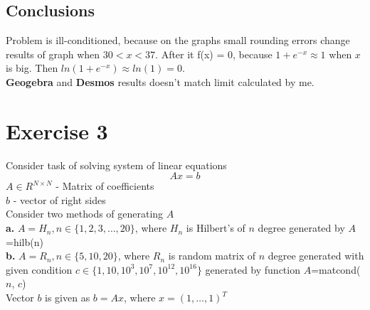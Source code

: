 \documentclass[11pt]{article}
\begin{document}
\subsection{Conclusions}
Problem is ill-conditioned, because on the graphs small rounding errors change results of graph when $30< x < 37$. 
After it f(x) = 0, because $1+e^{-x} \approx 1$ when $x$ is big. Then $ln(1+e^{-x}) \approx ln(1) = 0$. \\ 
\textbf{Geogebra} and \textbf{Desmos} results doesn't match limit calculated by me.
\section{Exercise 3}
Consider task of solving system of linear equations
\begin{equation*}
    Ax = b
\end{equation*}
$A \in R^{N \times N}$ - Matrix of coefficients\\
$b$ - vector of right sides\\
Consider two methods of generating $A$\\
\textbf{a.} 
$A = H_n, n \in \{1,2,3,\hdots,20\}$, where $H_n$ is Hilbert's of $n$ degree generated by $A$=hilb(n)\\
\textbf{b.} 
$A = R_n, n \in \{5,10,20\}$, where $R_n$ is random matrix of $n$ degree generated 
with given condition $c \in \{1, 10, 10^3, 10^7, 10^{12}, 10^{16}\}$ generated by function $A$=matcond($n$, $c$)\\
Vector $b$ is given as $b = Ax$, where $x = (1,\dots,1)^T$
\end{document}
